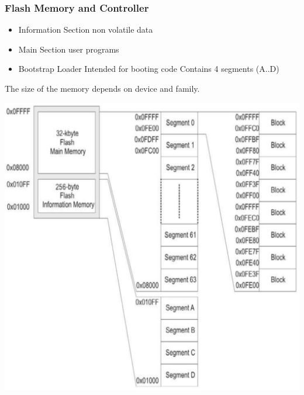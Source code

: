 \subsubsection{Flash Memory and Controller}
\begin{minipage}{0.5\linewidth}
    \begin{itemize}
        \item Information Section
        \subitem non volatile data 
        \item Main Section
        \subitem  user programs
        \item Bootstrap Loader
        \subitem Intended for booting code 
        \subitem Contains 4 segments (A..D)
    \end{itemize}
The size of the memory depends on device and family.
\end{minipage}
\begin{minipage}{0.5\linewidth}
    \includegraphics[width=0.7\linewidth]{images/FlashOrganization}
\end{minipage}

